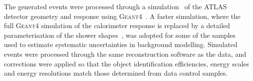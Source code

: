 \documentclass[PAPER, coverpage, atlasdraft=true, texlive=2016, UKenglish]{\ATLASLATEXPATH atlasdoc}
\begin{document}
The generated events were processed through a simulation~\cite{Aad:2010ah} of the ATLAS detector geometry and response 
using \textsc{Geant4}~\cite{Agostinelli:2002hh}. A faster simulation, where the full \textsc{Geant4} simulation of
the calorimeter response is replaced by a detailed parameterisation of the shower shapes~\cite{FastCaloSim},
was adopted for some of the samples used to estimate systematic uncertainties in background modelling.
Simulated events were processed through the same reconstruction software as the data, and corrections were applied so that the object identification 
efficiencies, energy scales and energy resolutions match those determined from data control samples.
\end{document}
